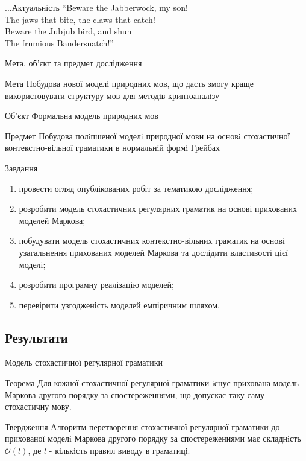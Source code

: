 \documentclass{beamer}
\begin{document}
\begin{darkframes}
\begin{frame}{...Актуальність}
      “Beware the Jabberwock, my son!\\
      The jaws that bite, the claws that catch!\\
      Beware the Jubjub bird, and shun\\
      The frumious Bandersnatch!”\\
    \end{frame}

    \begin{frame}[label=lists]{Мета, об'єкт та предмет дослідження}
      \begin{exampleblock}{Мета}
      Побудова нової моделi природних мов, що дасть змогу краще використовувати структуру мов для методiв криптоаналiзу
      \end{exampleblock}
      \begin{block}{Об'єкт}
        Формальна модель природних мов
      \end{block}
      \begin{block}{Предмет}
        Побудова полiпшеної моделi природної мови на основi стохастичної контекстно-вiльної граматики в нормальнiй формi Грейбах
      \end{block}

    \end{frame}

    \begin{frame}{Завдання}
      \begin{enumerate}
      \item провести огляд опублікованих робіт за тематикою дослідження;
      \item розробити модель стохастичних регулярних граматик на основі прихованих моделей Маркова;
      \item побудувати модель стохастичних контекстно-вільних граматик на основі узагальнення прихованих моделей Маркова та дослідити властивості цієї моделі;
      \item розробити програмну реалізацію моделей;
      \item перевірити узгодженість моделей емпіричним шляхом.
      \end{enumerate}
    \end{frame}
    \subsection{Результати}
    \begin{frame}{Модель стохастичної регулярної граматики}
      \begin{block}{Теорема}
        Для кожної стохастичної регулярної граматики iснує прихована модель Маркова другого порядку за спостереженнями, що допускає таку саму стохастичну мову.
      \end{block}
      \begin{block}{Твердження}
        Алгоритм перетворення стохастичної регулярної граматики до прихованої моделi Маркова другого порядку за спостереженнями має складнiсть $\mathcal{O}(l)$, де $l$ - кiлькiсть правил виводу в
        граматицi.
      \end{block}
    \end{frame}


\end{darkframes}
\end{document}
